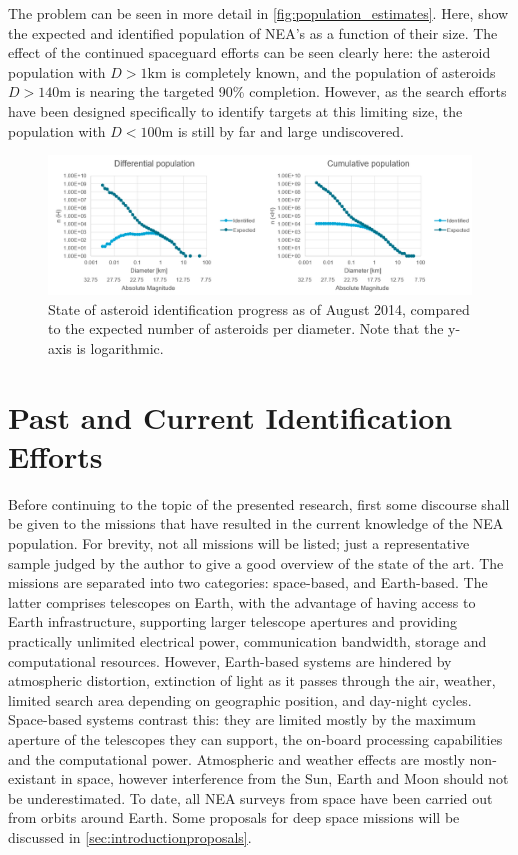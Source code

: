 The problem can be seen in more detail in \autoref{fig:population_estimates}. Here, \cite{HarrisPopulation} show the expected and identified population of NEA's as a function of their size. The effect of the continued spaceguard efforts can be seen clearly here: the asteroid population with $D > 1 \mathrm{km}$ is completely known, and the population of asteroids $D > 140 \mathrm{m}$ is nearing the targeted 90\% completion. However, as the search efforts have been designed specifically to identify targets at this limiting size, the population with $D < 100 \mathrm{m}$ is still by far and large undiscovered.

\begin{figure}[htbp]
 \centering
 \includegraphics[width=1.0\textwidth]{img/population_estimates.png}
 \caption{State of asteroid identification progress as of August 2014, compared to the expected number of asteroids per diameter. Note that the y-axis is logarithmic. \cite{HarrisPopulation}}
 \label{fig:population_estimates}
\end{figure}


\section{Past and Current Identification Efforts}
\label{sec:introductionidentification}

Before continuing to the topic of the presented research, first some discourse shall be given to the missions that have resulted in the current knowledge of the NEA population. For brevity, not all missions will be listed; just a representative sample judged by the author to give a good overview of the state of the art. The missions are separated into two categories: space-based, and Earth-based. The latter comprises telescopes on Earth, with the advantage of having access to Earth infrastructure, supporting larger telescope apertures and providing practically unlimited electrical power, communication bandwidth, storage and computational resources. However, Earth-based systems are hindered by atmospheric distortion, extinction of light as it passes through the air, weather, limited search area depending on geographic position, and day-night cycles. Space-based systems contrast this: they are limited mostly by the maximum aperture of the telescopes they can support, the on-board processing capabilities and the computational power. Atmospheric and weather effects are mostly non-existant in space, however interference from the Sun, Earth and Moon should not be underestimated. To date, all NEA surveys from space have been carried out from orbits around Earth. Some proposals for deep space missions will be discussed in \autoref{sec:introductionproposals}.\\

